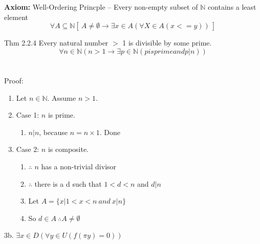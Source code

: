 \textbf{Axiom:} Well-Ordering Princple -- Every non-empty subset of $\mathbb{N}$ contains a least element
\\
\[ \forall A \subseteq \mathbb{N} \left[\ A \neq \emptyset \to \exists x \in A \left( \forall X \in A \left( x <= y \right) \right)\ \right]\]

Thm 2.2.4 Every natural number $>$ 1 is divisible by some prime. 
\[\forall n \in \mathbb{N} \left( n > 1 \to \exists p \in \mathbb{N} \left( p is prime and p|n \right) \right) \] %
\\ \\
Proof: 
\begin{enumerate}
\item Let $n\in\mathbb{N}$. Assume $n>1$.
\item Case 1: $n$ is prime. 
\begin{enumerate}\item $n|n$, because $n = n \times 1$. Done \end{enumerate}
\item Case 2: $n$ is composite.
\begin{enumerate}
	\item $\therefore$ $n$ has a non-trivial divisor
	\item $\therefore$ there is a d such that $1 < d < n$ and $d|n$
	\item Let $A = \{ x | 1 < x < n\ and\ x|n \}$
	\item So $d \in A\ \therefore A \neq \emptyset$
\end{enumerate}
\end{enumerate}

3b. $\exists x \in D \left( \forall y \in U  \left( f(\pi y) = 0 \right) \right)$ 



